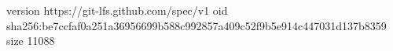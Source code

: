 version https://git-lfs.github.com/spec/v1
oid sha256:be7ccfaf0a251a36956699b588c992857a409c52f9b5e914c447031d137b8359
size 11088

